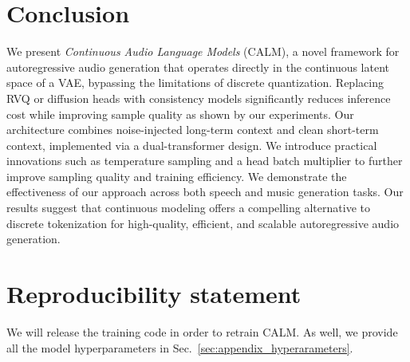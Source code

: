 
\section{Conclusion}

We present \textit{Continuous Audio Language Models} (CALM), a novel framework for autoregressive audio generation that operates directly in the continuous latent space of a VAE, bypassing the limitations of discrete quantization. 
Replacing RVQ or diffusion heads with consistency models significantly reduces inference cost while improving sample quality as shown by our experiments. 
Our architecture combines noise-injected long-term context and clean short-term context, implemented via a dual-transformer design. 
We introduce practical innovations such as temperature sampling and a head batch multiplier to further improve sampling quality and training efficiency. We demonstrate the effectiveness of our approach across both speech and music generation tasks. Our results suggest that continuous modeling offers a compelling alternative to discrete tokenization for high-quality, efficient, and scalable autoregressive audio generation. %


\section{Reproducibility statement}
We will release the training code in order to retrain CALM. As well, we provide all the model hyperparameters in Sec.~\ref{sec:appendix_hyperarameters}.

